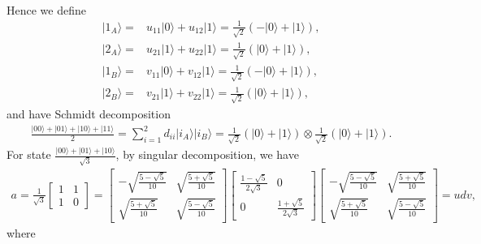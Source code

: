 \documentclass[en]{sol-man}
\begin{document}
\begin{pf}
\begin{align}
    \end{align}
    Hence we define
    \begin{align}
        \lvert 1_A\rangle=&u_{11}\lvert 0\rangle+u_{12}\lvert 1\rangle=\frac{1}{\sqrt{2}}(-\lvert 0\rangle+\lvert 1\rangle),\\
        \lvert 2_A\rangle=&u_{21}\lvert 1\rangle+u_{22}\lvert 1\rangle=\frac{1}{\sqrt{2}}(\lvert 0\rangle+\lvert 1\rangle),\\
        \lvert 1_B\rangle=&v_{11}\lvert 0\rangle+v_{12}\lvert 1\rangle=\frac{1}{\sqrt{2}}(-\lvert 0\rangle+\lvert 1\rangle),\\
        \lvert 2_B\rangle=&v_{21}\lvert 1\rangle+v_{22}\lvert 1\rangle=\frac{1}{\sqrt{2}}(\lvert 0\rangle+\lvert 1\rangle),
    \end{align}
    and have Schmidt decomposition
    \begin{align}
        \frac{\lvert 00\rangle+\lvert 01\rangle+\lvert 10\rangle+\lvert 11\rangle}{2}=\sum_{i=1}^2d_{ii}\lvert i_A\rangle\lvert i_B\rangle=\frac{1}{\sqrt{2}}(\lvert 0\rangle+\lvert 1\rangle)\otimes\frac{1}{\sqrt{2}}(\lvert 0\rangle+\lvert 1\rangle).
    \end{align}
    For state $\frac{\lvert 00\rangle+\lvert 01\rangle+\lvert 10\rangle}{\sqrt{3}}$, by singular decomposition, we have
    \begin{align}
        a=\frac{1}{\sqrt{3}}\left[\begin{matrix}
            1&1\\
            1&0
        \end{matrix}\right]=\left[\begin{matrix}
            -\sqrt{\frac{5-\sqrt{5}}{10}}&\sqrt{\frac{5+\sqrt{5}}{10}}\\
            \sqrt{\frac{5+\sqrt{5}}{10}}&\sqrt{\frac{5-\sqrt{5}}{10}}
        \end{matrix}\right]\left[\begin{matrix}
            \frac{1-\sqrt{5}}{2\sqrt{3}}&0\\
            0&\frac{1+\sqrt{5}}{2\sqrt{3}}
        \end{matrix}\right]\left[\begin{matrix}
            -\sqrt{\frac{5-\sqrt{5}}{10}}&\sqrt{\frac{5+\sqrt{5}}{10}}\\
            \sqrt{\frac{5+\sqrt{5}}{10}}&\sqrt{\frac{5-\sqrt{5}}{10}}
        \end{matrix}\right]=udv,
    \end{align}
    where
    \begin{align}

\end{align}
\end{pf}
\end{document}
